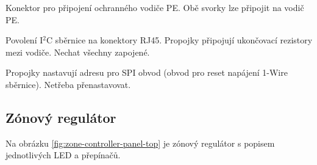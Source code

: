 \begin{Czech}
\end{Czech}

\begin{Czech}
Konektor pro připojení ochranného vodiče PE. Obě svorky lze připojit na vodič PE.
\end{Czech}

\begin{Czech}
\end{Czech}

\begin{Czech}
Povolení I$^2$C sběrnice na konektory RJ45. Propojky připojují ukončovací rezistory mezi vodiče. Nechat všechny zapojené.
\end{Czech}

\begin{Czech}
\end{Czech}

\begin{Czech}
Propojky nastavují adresu pro SPI obvod (obvod pro reset napájení 1-Wire sběrnice).  Netřeba přenastavovat.
\end{Czech}



\newpage
\begin{Czech}
\subsection{Zónový regulátor}
\end{Czech}

\begin{Czech}
Na obrázku \ref{fig:zone-controller-panel-top} je zónový regulátor s popisem jednotlivých LED a přepínačů.
\end{Czech}

